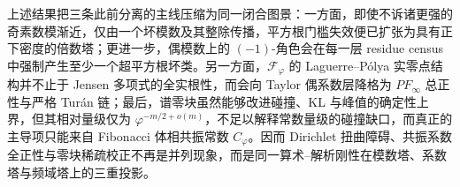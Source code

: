 \noindent
上述结果把三条此前分离的主线压缩为同一闭合图景：一方面，即使不诉诸更强的奇素数模渐近，仅由一个坏模数及其整除传播，平方根门槛失效便已扩张为具有正下密度的倍数塔；更进一步，偶模数上的 \((-1)\)-角色会在每一层 residue census 中强制产生至少一个超平方根坏类。另一方面，\(\mathcal F_\varphi\) 的 Laguerre--P\'olya 实零点结构并不止于 Jensen 多项式的全实根性，而会向 Taylor 偶系数层降格为 \(PF_\infty\) 总正性与严格 Tur\'an 链；最后，谱零块虽然能够改进碰撞、KL 与峰值的确定性上界，但其相对量级仅为 \(\varphi^{-m/2+o(m)}\)，不足以解释常数量级的碰撞缺口，而真正的主导项只能来自 Fibonacci 体相共振常数 \(C_\varphi\)。因而 Dirichlet 扭曲障碍、共振系数全正性与零块稀疏校正不再是并列现象，而是同一算术--解析刚性在模数塔、系数塔与频域塔上的三重投影。

\endinput
